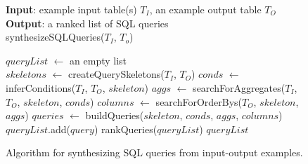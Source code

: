\begin{figure}[t]

\textbf{Input}: example input table(s) $T_I$, an example output table $T_O$\\

\vspace{-4mm}
\textbf{Output}: a ranked list of SQL queries\\
\vspace{1mm}
synthesizeSQLQueries({$T_{I}$, $T_{o}$})\\
\vspace{-5mm}
\begin{algorithmic}[1]
\STATE $\mathit{queryList}$ $\leftarrow$ an empty list\\
\STATE $\mathit{skeletons}$ $\leftarrow$ createQuerySkeletons($\mathit{T_I}$, $\mathit{T_O}$)
\STATE $\mathit{conds}$ $\leftarrow$ inferConditions($\mathit{T_I}$, $\mathit{T_O}$, $\mathit{skeleton}$)
\STATE $\mathit{aggs}$ $\leftarrow$ searchForAggregates($\mathit{T_I}$, $\mathit{T_O}$, $\mathit{skeleton}$, $conds$)
\STATE $\mathit{columns}$ $\leftarrow$ searchForOrderBys($\mathit{T_O}$, $\mathit{skeleton}$, $\mathit{aggs}$)
\STATE $\mathit{queries}$ $\leftarrow$ buildQueries($\mathit{skeleton}$, $\mathit{conds}$, $\mathit{aggs}$, $\mathit{columns}$)
\STATE $\mathit{queryList}$.add($\mathit{query}$)
\ENDIF
\ENDFOR
\ENDFOR
\STATE rankQueries($\mathit{queryList}$)
\RETURN $\mathit{queryList}$
\end{algorithmic}
\vspace{-3mm}
\caption{Algorithm for synthesizing SQL queries from input-output examples.}
 \label{fig:algorithm}
\end{figure}
